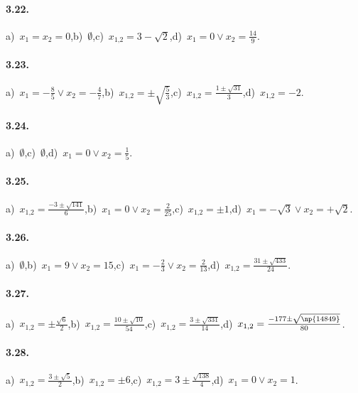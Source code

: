 \paragraph{3.22.} a)~$x_{1} = x_{2} = 0$,\quad b)~$\emptyset$,\quad c)~$x_{1\text{,}2}= 3-\sqrt{2}$,\quad d)~$x_{1} = 0 \vee x_{2} = \frac{14}{9}$.

\paragraph{3.23.} a)~$x_{1} =-\frac{8}{5} \vee x_{2} =-\frac{4}{7}$,\quad b)~$x_{1\text{,}2} = \pm \sqrt{\frac{5}{3}}$,\quad c)~$x_{1\text{,}2} = \frac{1 \pm \sqrt{31}}{3}$,\quad d)~$x_{1\text{,}2}=-2$.

\paragraph{3.24.} a)~$\emptyset$,\quad c)~$\emptyset$,\quad d)~$x_{1} = 0 \vee x_{2} = \frac{1}{5}$.

\paragraph{3.25.} a)~$x_{1\text{,}2} = \frac{- 3 \pm \sqrt{141}}{6}$,\quad b)~$x_{1} = 0 \vee x_{2} = \frac{2}{25}$,\quad c)~$x_{1\text{,}2} =\pm 1$,\quad d)~$x_{1} =-\sqrt{3} \vee x_{2} = + \sqrt{2}$.

\paragraph{3.26.} a)~$\emptyset$,\quad b)~$x_{1} = 9 \vee x_{2} = 15$,\quad c)~$x_{1} =-\frac{2}{3} \vee x_{2} = \frac{2}{13}$,\quad d)~$x_{1\text{,}2} = \frac{31 \pm \sqrt{433}}{24}$.

\paragraph{3.27.} a)~$x_{1\text{,}2} = \pm \frac{\sqrt{6}}{2}$,\quad b)~$x_{1\text{,}2} = \frac{10 \pm \sqrt{10}}{54}$,\quad c)~$x_{1\text{,}2} = \frac{3 \pm \sqrt{331}}{14}$,\quad d)~$x_{1\text{,}2} = \frac{- 177 \pm \sqrt{\np{14849}}}{80}$.

\paragraph{3.28.} a)~$x_{1\text{,}2} = \frac{3 \pm \sqrt{5}}{2}$,\quad b)~$x_{1\text{,}2} =\pm 6$,\quad c)~$x_{1\text{,}2} = 3 \pm \frac{\sqrt{138}}{4}$,\quad d)~$x_{1} =0 \vee x_{2} =1$.

